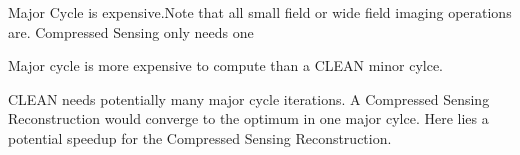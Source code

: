 Major Cycle is expensive.Note that all small field or wide field imaging operations are. Compressed Sensing only needs one


Major cycle is more expensive to compute than a CLEAN minor cylce. 

CLEAN needs potentially many major cycle iterations. A Compressed Sensing Reconstruction would converge to the optimum in one major cylce. Here lies a potential speedup for the Compressed Sensing Reconstruction.







 
